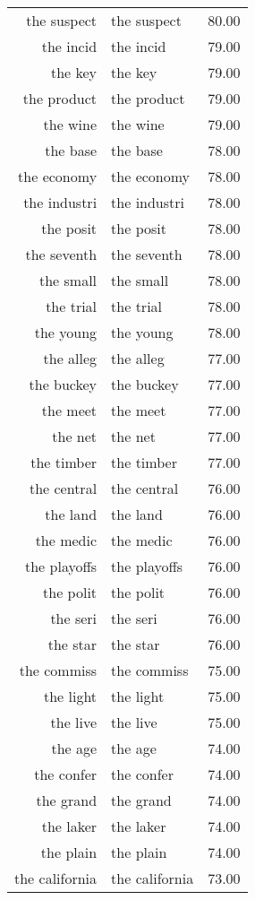 \begin{table}[ht]
\begin{tabular}{rlr}
  the suspect & the suspect & 80.00 \\ 
  the incid & the incid & 79.00 \\ 
  the key & the key & 79.00 \\ 
  the product & the product & 79.00 \\ 
  the wine & the wine & 79.00 \\ 
  the base & the base & 78.00 \\ 
  the economy & the economy & 78.00 \\ 
  the industri & the industri & 78.00 \\ 
  the posit & the posit & 78.00 \\ 
  the seventh & the seventh & 78.00 \\ 
  the small & the small & 78.00 \\ 
  the trial & the trial & 78.00 \\ 
  the young & the young & 78.00 \\ 
  the alleg & the alleg & 77.00 \\ 
  the buckey & the buckey & 77.00 \\ 
  the meet & the meet & 77.00 \\ 
  the net & the net & 77.00 \\ 
  the timber & the timber & 77.00 \\ 
  the central & the central & 76.00 \\ 
  the land & the land & 76.00 \\ 
  the medic & the medic & 76.00 \\ 
  the playoffs & the playoffs & 76.00 \\ 
  the polit & the polit & 76.00 \\ 
  the seri & the seri & 76.00 \\ 
  the star & the star & 76.00 \\ 
  the commiss & the commiss & 75.00 \\ 
  the light & the light & 75.00 \\ 
  the live & the live & 75.00 \\ 
  the age & the age & 74.00 \\ 
  the confer & the confer & 74.00 \\ 
  the grand & the grand & 74.00 \\ 
  the laker & the laker & 74.00 \\ 
  the plain & the plain & 74.00 \\ 
  the california & the california & 73.00 \\ 

\end{tabular}
\end{table}
